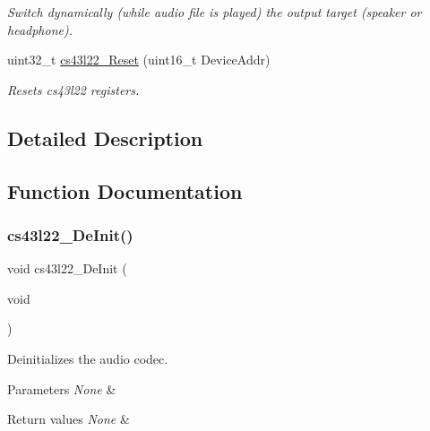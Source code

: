 \begin{DoxyCompactItemize}
\begin{DoxyCompactList}\small\item\em Switch dynamically (while audio file is played) the output target (speaker or headphone). \end{DoxyCompactList}\item 
uint32\+\_\+t \mbox{\hyperlink{group___c_s43_l22___private___functions_ga647488feb466972a5557a2fe2e9350e7}{cs43l22\+\_\+\+Reset}} (uint16\+\_\+t Device\+Addr)
\begin{DoxyCompactList}\small\item\em Resets cs43l22 registers. \end{DoxyCompactList}\end{DoxyCompactItemize}


\subsection{Detailed Description}


\subsection{Function Documentation}
\mbox{\label{group___c_s43_l22___private___functions_gaeba1251bafcbeacb591dfe8cb8175447}} 
\subsubsection{\texorpdfstring{cs43l22\+\_\+\+De\+Init()}{cs43l22\_DeInit()}}
{\footnotesize\ttfamily void cs43l22\+\_\+\+De\+Init (\begin{DoxyParamCaption}\item[{void}]{ }\end{DoxyParamCaption})}



Deinitializes the audio codec. 


\begin{DoxyParams}{Parameters}
{\em None} & \\
\hline
\end{DoxyParams}

\begin{DoxyRetVals}{Return values}
{\em None} & \\
\hline
\end{DoxyRetVals}
\mbox{\label{group___c_s43_l22___private___functions_ga47b373a281c7ba0ea0fac752f3d0a903}} 
